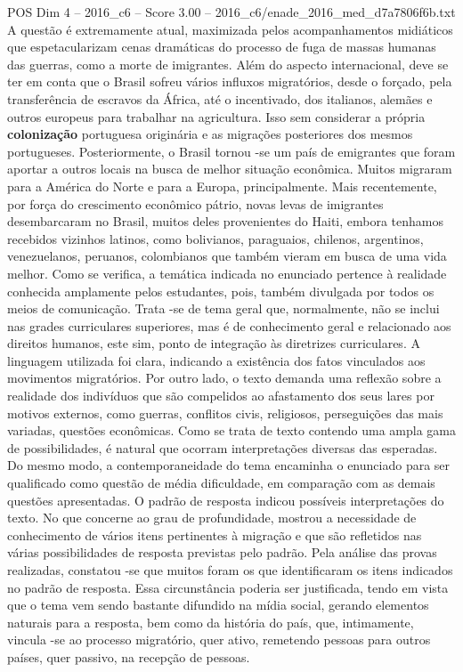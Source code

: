 \begin{textsample}{POS Dim 4 – 2016\_c6 – Score 3.00 – 2016\_c6/enade\_2016\_med\_d7a7806f6b.txt}
A questão é extremamente atual, maximizada pelos acompanhamentos midiáticos que espetacularizam cenas dramáticas do processo de fuga de massas humanas das guerras, como a morte de imigrantes.
Além do aspecto internacional, deve se ter em conta que o Brasil sofreu vários influxos migratórios, desde o forçado, pela transferência de escravos da África, até o incentivado, dos italianos, alemães e outros europeus para trabalhar na agricultura.
Isso sem considerar a própria \textbf{colonização} portuguesa originária e as migrações posteriores dos mesmos portugueses.
Posteriormente, o Brasil tornou -se um país de emigrantes que foram aportar a outros locais na busca de melhor situação econômica.
Muitos migraram para a América do Norte e para a Europa, principalmente.
Mais recentemente, por força do crescimento econômico pátrio, novas levas de imigrantes desembarcaram no Brasil, muitos deles provenientes do Haiti, embora tenhamos recebidos vizinhos latinos, como bolivianos, paraguaios, chilenos, argentinos, venezuelanos, peruanos, colombianos que também vieram em busca de uma vida melhor.
Como se verifica, a temática indicada no enunciado pertence à realidade conhecida amplamente pelos estudantes, pois, também divulgada por todos os meios de comunicação.
Trata -se de tema geral que, normalmente, não se inclui nas grades curriculares superiores, mas é de conhecimento geral e relacionado aos direitos humanos, este sim, ponto de integração às diretrizes curriculares.
A linguagem utilizada foi clara, indicando a existência dos fatos vinculados aos movimentos migratórios.
Por outro lado, o texto demanda uma reflexão sobre a realidade dos indivíduos que são compelidos ao afastamento dos seus lares por motivos externos, como guerras, conflitos civis, religiosos, perseguições das mais variadas, questões econômicas.
Como se trata de texto contendo uma ampla gama de possibilidades, é natural que ocorram interpretações diversas das esperadas.
Do mesmo modo, a contemporaneidade do tema encaminha o enunciado para ser qualificado como questão de média dificuldade, em comparação com as demais questões apresentadas.
O padrão de resposta indicou possíveis interpretações do texto.
No que concerne ao grau de profundidade, mostrou a necessidade de conhecimento de vários itens pertinentes à migração e que são refletidos nas várias possibilidades de resposta previstas pelo padrão.
Pela análise das provas realizadas, constatou -se que muitos foram os que identificaram os itens indicados no padrão de resposta.
Essa circunstância poderia ser justificada, tendo em vista que o tema vem sendo bastante difundido na mídia social, gerando elementos naturais para a resposta, bem como da história do país, que, intimamente, vincula -se ao processo migratório, quer ativo, remetendo pessoas para outros países, quer passivo, na recepção de pessoas.

\end{textsample}
